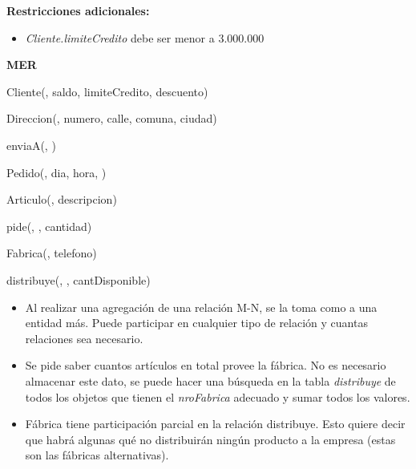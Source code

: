 \textbf{Restricciones adicionales:}
\begin{itemize}
\item \textit{Cliente.limiteCredito} debe ser menor a 3.000.000
\end{itemize}

\begin{multicols}{2}
\textbf{MER}

Cliente(, saldo, limiteCredito, descuento)

Direccion(, numero, calle, comuna, ciudad)

enviaA(, )

Pedido(, dia, hora, )

Articulo(, descripcion)

pide(, , cantidad)

Fabrica(, telefono)

distribuye(, , cantDisponible)

\columnbreak
{}
\begin{itemize}
	\item Al realizar una agregación de una relación M-N, se la toma como a una entidad más. Puede participar en cualquier tipo de relación y cuantas relaciones sea necesario.
	\item Se pide saber cuantos artículos en total provee la fábrica. No es necesario almacenar este dato, se puede hacer una búsqueda en la tabla \textit{distribuye} de todos los objetos que tienen el \textit{nroFabrica} adecuado y sumar todos los valores.
	\item Fábrica tiene participación parcial en la relación distribuye. Esto quiere decir que habrá algunas qué no distribuirán ningún producto a la empresa (estas son las fábricas alternativas).
\end{itemize}

\end{multicols}
